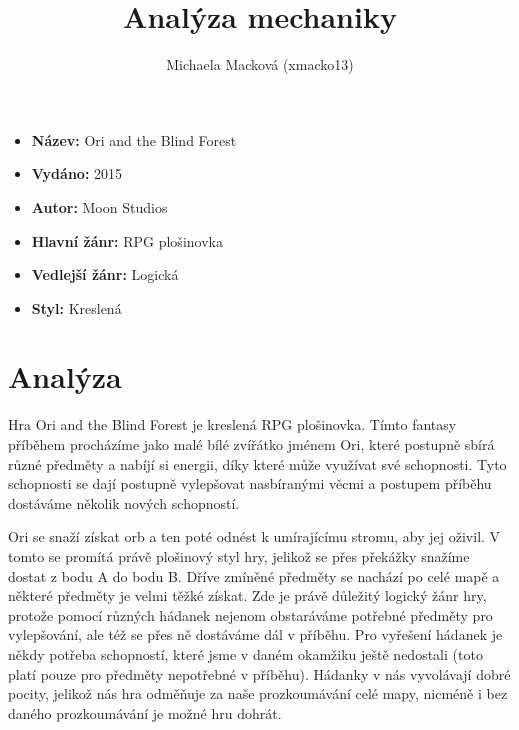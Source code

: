 \documentclass[a4paper,10pt,english]{article}
\title{%
Analýza mechaniky%
}
\author{%
Michaela Macková (xmacko13)%
}
\date{}
\begin{document}
\maketitle
\thispagestyle{empty}

{%
\large

\begin{itemize}

\item[] \textbf{Název:} Ori and the Blind Forest

\item[] \textbf{Vydáno:} 2015

\item[] \textbf{Autor:} Moon Studios

\item[] \textbf{Hlavní žánr:} RPG plošinovka

\item[] \textbf{Vedlejší žánr:} Logická

\item[] \textbf{Styl:} Kreslená

\end{itemize}

}

\section*{\centering Analýza}

Hra Ori and the Blind Forest je kreslená RPG plošinovka. Tímto fantasy příběhem procházíme jako malé bílé zvířátko jménem Ori, které postupně sbírá různé předměty a nabíjí si energii, díky které může využívat své schopnosti. Tyto schopnosti se dají postupně vylepšovat nasbíranými věcmi a postupem příběhu dostáváme několik nových schopností.

Ori se snaží získat orb a ten poté odnést k umírajícímu stromu, aby jej oživil. V tomto se promítá právě plošinový styl hry, jelikož se přes překážky snažíme dostat z bodu A do bodu B. Dříve zmíněné předměty se nachází po celé mapě a některé předměty je velmi těžké získat. Zde je právě důležitý logický žánr hry, protože pomocí různých hádanek nejenom obstaráváme potřebné předměty pro vylepšování, ale též se přes ně dostáváme dál v příběhu. Pro vyřešení hádanek je někdy potřeba schopností, které jsme v daném okamžiku ještě nedostali (toto platí pouze pro předměty nepotřebné v příběhu). Hádanky v nás vyvolávají dobré pocity, jelikož nás hra odměňuje za naše prozkoumávání celé mapy, nicméně i bez daného prozkoumávání je možné hru dohrát.
\end{document}
